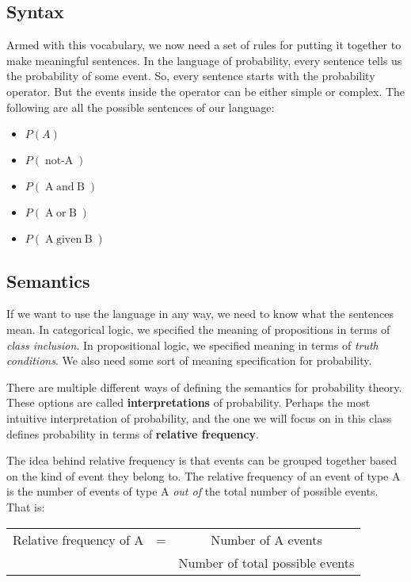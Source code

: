 \documentclass[letterpaper,10pt]{article}
\newcommand\negate[1]{\mathop{\mbox{$not$-$#1$}}}
\newcommand\disjoin[2]{\mathop{\mbox{$#1\; or\; #2$}}}
\newcommand\conjoin[2]{\mathop{\mbox{$#1\; and\; #2$}}}
\newcommand\given[2]{\mathop{\mbox{$#1\; given\; #2$}}}
\begin{document}
\subsection{Syntax}

Armed with this vocabulary, we now need a set of rules for putting it together to make meaningful sentences.  In the language of probability, every sentence tells us the probability of some event. So, every sentence starts with the probability operator.  But the events inside the operator can be either simple or complex. The following are all the possible sentences of our language:
\begin{itemize}
 \item $P(A)$
 \item $P(\negate{A})$
 \item $P(\conjoin{A}{B})$
 \item $P(\disjoin{A}{B})$
 \item $P(\given{A}{B})$
\end{itemize}

\subsection{Semantics}

If we want to use the language in any way, we need to know what the sentences mean.  In categorical logic, we specified the meaning of propositions in terms of \textit{class inclusion}.  In propositional logic, we specified meaning in terms of \textit{truth conditions}. We also need some sort of meaning specification for probability.

There are multiple different ways of defining the semantics for probability theory.  These options are called \textbf{interpretations} of probability. Perhaps the most intuitive interpretation of probability, and the one we will focus on in this class defines probability in terms of \textbf{relative frequency}.

The idea behind relative frequency is that events can be grouped together based on the kind of event they belong to.  The relative frequency of an event of type A is the number of events of type A \textit{out of} the total number of possible events.  That is:

\begin{tabular}{ccc}
 Relative frequency of A & = & Number of A events \\ \cline{3-3}
 & & Number of total possible events \\
\end{tabular}
\end{document}
